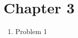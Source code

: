 \documentclass[11pt]{article}
\begin{document}

\section{Chapter 3}
\begin{enumerate}
\item Problem 1\\

\end{enumerate}
\end{document}
